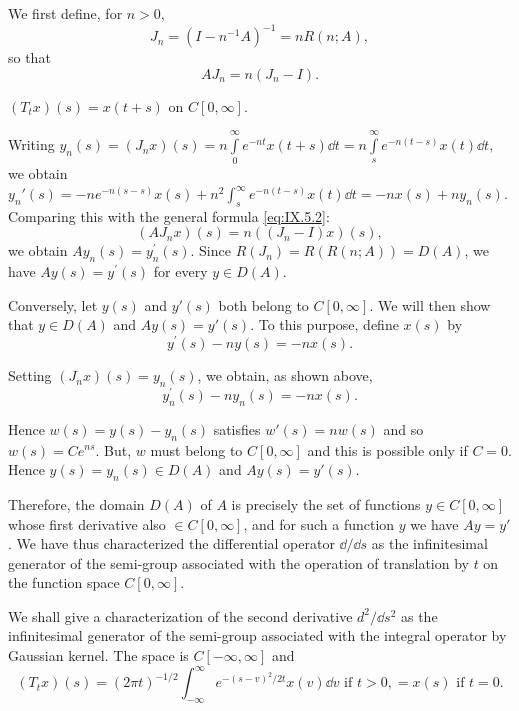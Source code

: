 \label{sec:IX.5}

We first define, for $n > 0$, 
\begin{equation}\label{eq:IX.5.1}
J _{n} = (I - n ^{-1} A) ^{-1} = n R (n; A),
\end{equation}
so that 
\begin{equation}\label{eq:IX.5.2}
A J _{n} = n (J _{n} - I).
\end{equation}

\begin{example}\label{ex:IX.5.Example.1} $(T_{t}x)(s) = x(t + s)$ on $C[0,\infty]$. 
\end{example}

Writing $y_{n}(s) = (J_{n}x)(s) = n\int \limits_{0}^{\infty}e^{-nt}x(t + s)\dd t = n\int \limits_{s}^{\infty}e^{-n(t-s)}x(t)\dd t,$ 
we obtain $y_n'(s) = -n e^{-n(s-s)} x(s) + n^2 \int_s^{\infty} e^{-n(t-s)} x(t) \dd t = -n x(s) + n y_n(s)$. Comparing this with the general formula \eqref{eq:IX.5.2}: 
\[
(A J _{n} x) (s) = n ((J _{n} - I) x) (s),
\]
we obtain $A y_{n}(s) = y_{n}^{\prime}(s)$. Since $R(J_{n}) = R(R(n;A)) = D(A)$, we have $A y(s) = y^{\prime}(s)$ for every $y \in D(A)$. 

Conversely, let $y(s)$ and $y'(s)$ both belong to $C[0, \infty]$. We will then show that $y \in D(A)$ and $A y(s) = y'(s)$. To this purpose, define $x(s)$ by 
\[
y ^{\prime} (s) - n y (s) = - n x (s).
\]

Setting $(J_{n}x)(s) = y_{n}(s)$, we obtain, as shown above, 
\[
y _{n} ^{\prime} (s) - n y _{n} (s) = - n x (s).
\]

Hence $w(s) = y(s) - y_{n}(s)$ satisfies $w'(s) = nw(s)$ and so $w(s) = Ce^{ns}$. But, $w$ must belong to $C[0,\infty]$ and this is possible only if $C = 0$. Hence $y(s) = y_{n}(s) \in D(A)$ and $Ay(s) = y'(s)$. 

Therefore, the domain $D(A)$ of $A$ is precisely the set of functions $y \in C[0, \infty]$ whose first derivative also $\in C[0, \infty]$, and for such a function $y$ we have $A y = y'$. We have thus characterized the differential operator $\dd / \dd s$ as the infinitesimal generator of the semi-group associated with the operation of translation by $t$ on the function space $C[0, \infty]$. 

\begin{example}\label{ex:IX.5.Example.2} We shall give a characterization of the second derivative $d^{2}/\dd s^{2}$ as the infinitesimal generator of the semi-group associated with the integral operator by Gaussian kernel. The space is $C[-\infty,\infty]$ and 
\[
(T _{t} x) (s) = (2 \pi t) ^{-1/2} \int_{- \infty} ^{\infty} e ^ {- (s - v) ^{2} / 2 t} x (v) \dd v \text{ if } t > 0, = x (s) \text{ if } t = 0.
\]
\end{example}


